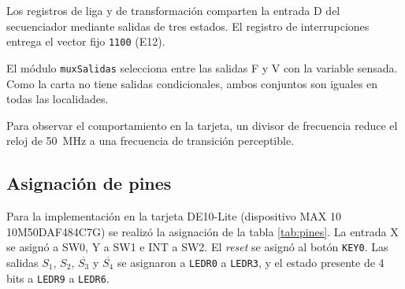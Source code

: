 
\label{fig:muxdir}

Los registros de liga y de transformación comparten la entrada D del secuenciador mediante salidas
de tres estados. El registro de interrupciones entrega el vector fijo \texttt{1100} (E12).


\label{fig:regmp}


\label{fig:regtrans}

El módulo \texttt{muxSalidas} selecciona entre las salidas F y V con la variable sensada. Como la
carta no tiene salidas condicionales, ambos conjuntos son iguales en todas las localidades.


\label{fig:muxsal}

Para observar el comportamiento en la tarjeta, un divisor de frecuencia reduce el reloj de 50~MHz a
una frecuencia de transición perceptible.


\label{fig:divfrec}

\subsection{Asignación de pines}

Para la implementación en la tarjeta DE10-Lite (dispositivo MAX 10 10M50DAF484C7G) se realizó la
asignación de la tabla \ref{tab:pines}. La entrada X se asignó a SW0, Y a SW1 e INT a SW2. El
\textit{reset} se asignó al botón \texttt{KEY0}. Las salidas $S_1$, $S_2$, $\overline{S_3}$ y
$\overline{S_4}$ se asignaron a \texttt{LEDR0} a \texttt{LEDR3}, y el estado presente de 4 bits a
\texttt{LEDR9} a \texttt{LEDR6}.

